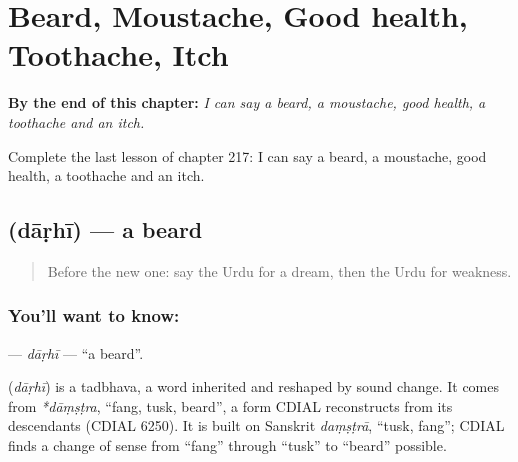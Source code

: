 
\chapter{Beard, Moustache, Good health, Toothache, Itch}
\label{ch:ur-beard-moustache-good-health-toothache-itch}

\begin{chapteropening}
\textbf{By the end of this chapter:} \emph{I can say a beard, a moustache, good health, a toothache and an itch.}

Complete the last lesson of chapter 217: I can say a beard, a moustache, good health, a toothache and an itch.
\end{chapteropening}

\section[\texorpdfstring{\ur{داڑھی} (dāṛhī)}{داڑھی (dāṛhī)}]{ (dāṛhī) — a beard}

\label{lesson:UR-C217-darhi}



\begin{quote}
Before the new one: say the Urdu for a dream, then the Urdu for weakness.
\end{quote}

\subsection*{You'll want to know: }
\textbf{} — \emph{dāṛhī} — \textquotedblleft{}a beard\textquotedblright{}.

\begin{cousinweb}
\textbf{} (\emph{dāṛhī}) is a tadbhava, a word inherited and reshaped by sound change. It comes from \emph{*dāṃṣṭra}, \textquotedblleft{}fang, tusk, beard\textquotedblright{}, a form CDIAL reconstructs from its descendants (CDIAL 6250). It is built on Sanskrit \emph{daṃṣṭrā}, \textquotedblleft{}tusk, fang\textquotedblright{}; CDIAL finds a change of sense from \textquotedblleft{}fang\textquotedblright{} through \textquotedblleft{}tusk\textquotedblright{} to \textquotedblleft{}beard\textquotedblright{} possible.
\end{cousinweb}

